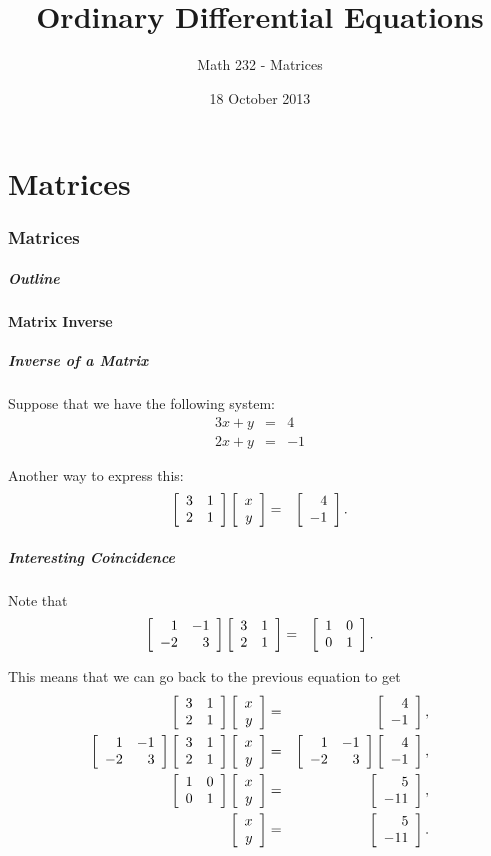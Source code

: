 \part{Matrices}
\section{Matrices}

\title{Ordinary Differential Equations}
\subtitle{Math 232 - Matrices}
\date{18 October 2013}

\begin{frame}
  \titlepage
\end{frame}

\begin{frame}
  \frametitle{Outline}
  \tableofcontents[ currentsection ]
\end{frame}


\subsection{Matrix Inverse}


\begin{frame}
  \frametitle{Inverse of a Matrix}

  Suppose that we have the following system:
  \begin{eqnarray*}
    3x + y & = & 4 \\
    2x + y & = & -1
  \end{eqnarray*}

  Another way to express this:
  \begin{eqnarray*}
    \arrayTwo{3}{1}{2}{1} \vecTwo{x}{y} & = & \vecTwo{4}{-1}.
  \end{eqnarray*}

\end{frame}


\begin{frame}
  \frametitle{Interesting Coincidence}

  Note that
  \begin{eqnarray*}
    \arrayTwo{1}{-1}{-2}{3} \arrayTwo{3}{1}{2}{1}  & = & \arrayTwo{1}{0}{0}{1}.
  \end{eqnarray*}

  This means that we can go back to the previous equation to get
  \begin{eqnarray*}
    \arrayTwo{3}{1}{2}{1} \vecTwo{x}{y} & = & \vecTwo{4}{-1}, \\
    \arrayTwo{1}{-1}{-2}{3} \arrayTwo{3}{1}{2}{1} \vecTwo{x}{y} & = & 
          \arrayTwo{1}{-1}{-2}{3}\vecTwo{4}{-1}, \\
    \arrayTwo{1}{0}{0}{1} \vecTwo{x}{y} & = & \vecTwo{5}{-11}, \\
    \vecTwo{x}{y} & = & \vecTwo{5}{-11}.
  \end{eqnarray*}


\end{frame}

